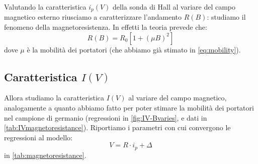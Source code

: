 
Valutando la caratteristica $ i_p(V) $ della sonda di Hall al variare del campo magnetico esterno riusciamo a caratterizzare l'andamento $ R(B) $: studiamo il fenomeno della magnetoresistenza.
In effetti la teoria prevede che:
\begin{equation} \label{eq:magnetoresistance}
R(B) = R_0[1 + (\mu B)^2]
\end{equation}
dove $ \mu $ è la mobilità dei portatori (che abbiamo già stimato in \cref{eq:mobility}).

\subsection{Caratteristica $ I(V) $}

Allora studiamo la caratteristica $ I(V) $ al variare del campo magnetico, analogamente a quanto abbiamo fatto per poter stimare la mobilità dei portatori nel campione di germanio (regressioni in \cref{fig:IV-Bvaries}, e dati in \cref{tab:IVmagnetoresistance}).
Riportiamo i parametri con cui convergono le regressioni al modello:
\begin{equation}
V = R \cdot i_p + \Delta
\end{equation}
in \cref{tab:magnetoresistance}.


